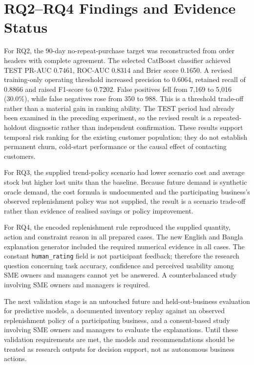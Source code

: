 \section{RQ2--RQ4 Findings and Evidence Status}

For RQ2, the 90-day no-repeat-purchase target was reconstructed from order
headers with complete agreement. The selected CatBoost classifier achieved
TEST PR-AUC 0.7461, ROC-AUC 0.8314 and Brier score 0.1650. A revised
training-only operating threshold increased precision to 0.6064, retained
recall of 0.8866 and raised F1-score to 0.7202. False positives fell from
7,169 to 5,016 (30.0\%), while false negatives rose from 350 to 988. This
is a threshold trade-off rather than a material gain in ranking ability.
The TEST period had already been examined in the preceding experiment, so
the revised result is a repeated-holdout diagnostic rather than independent
confirmation. These results support temporal risk ranking for the existing
customer population; they do not establish permanent churn, cold-start
performance or the causal effect of contacting customers.

For RQ3, the supplied trend-policy scenario had lower scenario cost and
average stock but higher lost units than the baseline. Because future demand
is synthetic oracle demand, the cost formula is undocumented and the participating
business's observed replenishment policy was not supplied, the result is a scenario trade-off rather
than evidence of realised savings or policy improvement.

For RQ4, the encoded replenishment rule reproduced the supplied quantity,
action and constraint reason in all prepared cases. The new English and
Bangla explanation generator included the required numerical evidence in all
cases. The constant \texttt{human\_rating} field is not participant feedback;
therefore the research question concerning task accuracy, confidence and
perceived usability among SME owners and managers cannot yet be answered.
A counterbalanced study involving SME owners and managers is required.

The next validation stage is an untouched future and held-out-business
evaluation for predictive models, a documented inventory replay against an
observed replenishment policy of a participating business, and a consent-based
study involving SME owners and managers to evaluate the explanations.
Until these validation requirements are met, the models and recommendations
should be treated as research outputs for decision support, not as autonomous
business actions.
